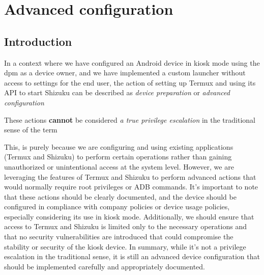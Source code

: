 {\color{teal!90}\chapter{Advanced configuration}\label{cap:advanced-configuration}}


\minitoc%


\section{Introduction}

In a context where we have configured an Android device in kiosk mode using the \gls{dpm} as a device owner, and we have implemented a custom launcher without access to settings for the end user, the action of setting up Termux and using its API to start Shizuku can be described as \emph{device preparation} or \emph{advanced configuration}

\medskip
\begin{center}
These actions \textbf{cannot} be considered {\color{BrickRed} \emph{a true privilege escalation}} in the traditional sense of the term
\end{center}
\medskip


This, is purely because we are configuring and using existing applications (Termux and Shizuku) to perform certain operations rather than gaining unauthorized or unintentional access at the system level. However, we are leveraging the features of Termux and Shizuku to perform advanced actions that would normally require root privileges or ADB commands. It's important to note that these actions should be clearly documented, and the device should be configured in compliance with company policies or device usage policies, especially considering its use in kiosk mode. Additionally, we should ensure that access to Termux and Shizuku is limited only to the necessary operations and that no security vulnerabilities are introduced that could compromise the stability or security of the kiosk device. In summary, while it's not a privilege escalation in the traditional sense, it is still an advanced device configuration that should be implemented carefully and appropriately documented.

